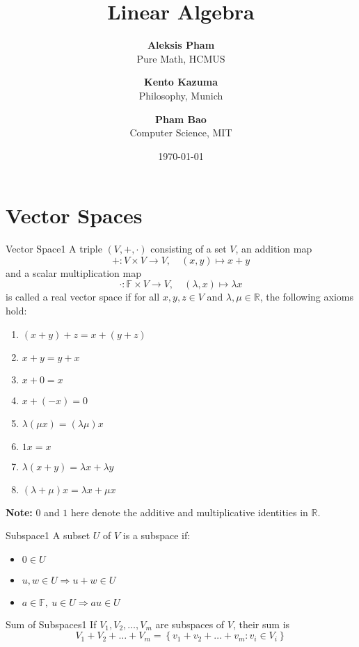 \documentclass[11pt]{article}
\title{\textbf{Linear Algebra}}
\author{
  \textbf{Aleksis Pham} \\ Pure Math, HCMUS \and
  \textbf{Kento Kazuma} \\ Philosophy, Munich \and
  \textbf{Pham Bao} \\ Computer Science, MIT
}
\date{\today}
\begin{document}
\maketitle

\section{Vector Spaces}

\begin{definition}{Vector Space}{1}
A triple $(V, +, \cdot)$ consisting of a set $V$, an addition map
\[
  + : V \times V \to V, \quad (x,y) \mapsto x + y
\]
and a scalar multiplication map
\[
  \cdot : \mathbb{F} \times V \to V, \quad (\lambda, x) \mapsto \lambda x
\]
is called a real vector space if for all $x, y, z \in V$ and $\lambda, \mu \in \mathbb{R}$, the following axioms hold:
\begin{enumerate}[label=\arabic*.]
  \item $(x + y) + z = x + (y + z)$
  \item $x + y = y + x$
  \item $x + 0 = x$
  \item $x + (-x) = 0$
  \item $\lambda(\mu x) = (\lambda \mu)x$
  \item $1x = x$
  \item $\lambda(x + y) = \lambda x + \lambda y$
  \item $(\lambda + \mu)x = \lambda x + \mu x$
\end{enumerate}
\end{definition}

\textbf{Note:} $0$ and $1$ here denote the additive and multiplicative identities in $\mathbb{R}$.

\begin{definition}{Subspace}{1}
A subset $U$ of $V$ is a subspace if:
\begin{itemize}
  \item $0 \in U$
  \item $u, w \in U \Rightarrow u + w \in U$
  \item $a \in \mathbb{F},\ u \in U \Rightarrow au \in U$
\end{itemize}
\end{definition}

\begin{definition}{Sum of Subspaces}{1}
If $V_1, V_2, \dots, V_m$ are subspaces of $V$, their sum is
\[
  V_1 + V_2 + \dots + V_m = \left\{ v_1 + v_2 + \dots + v_m : v_i \in V_i \right\}
\]
\end{definition}
\end{document}
